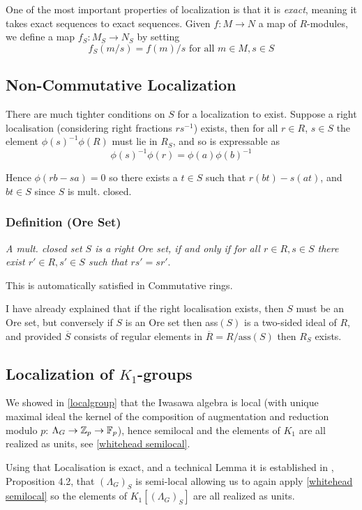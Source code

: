 One of the most important properties of localization is that it is \emph{exact}, meaning it takes exact sequences to exact sequences. Given $f:M\rightarrow N$ a map of $R$-modules, we define a map $f_S:M_S\rightarrow N_S$ by setting
$$f_S(m/s) = f(m)/s \text{ for all } m\in M, s\in S$$

\subsection{Non-Commutative Localization}
There are much tighter conditions on $S$ for a localization to exist. Suppose a right localisation (considering right fractions $rs^{-1}$) exists, then for all $r\in R$, $s\in S$ the element $\phi(s)^{-1}\phi (R)$ must lie in $R_S$, and so is expressable as
$$\phi(s)^{-1}\phi (r) = \phi(a) \phi (b)^{-1}$$

Hence $\phi(rb-sa) = 0$ so there exists a $t\in S$ such that $r(bt) - s(at)$, and $bt\in S$ since $S$ is mult. closed.

\subsubsection*{Definition (Ore Set)}
\emph{A mult. closed set $S$ is a right Ore set, if and only if for all $r\in R, s\in S$ there exist $r'\in R, s'\in S$ such that $rs'=sr'$}. 

This is automatically satisfied in Commutative rings.

I have already explained that if the right localisation exists, then $S$ must be an Ore set, but conversely if $S$ is an Ore set then ass$(S)$ is a two-sided ideal of $R$, and provided $\overline S$ consists of regular elements in $\overline R = R / \text{ass} (S)$ then $R_S$ exists.






\subsection{Localization of $K_1$-groups}
We showed in \ref{localgroup} that the Iwasawa algebra is local (with unique maximal ideal the kernel of the composition of augmentation and reduction modulo $p$: $\Lambda_G\rightarrow \mathbb Z_p\rightarrow \mathbb F_p$), hence semilocal and the elements of $K_1$ are all realized as units, see \ref{whitehead semilocal}.

Using that Localisation is exact, and a technical Lemma it is established in \cite{CFKSV}, Proposition 4.2,  that $(\Lambda_G)_S$ is semi-local allowing us to again apply \ref{whitehead semilocal} so the elements of $K_1[(\Lambda_G)_S]$ are all realized as units.

